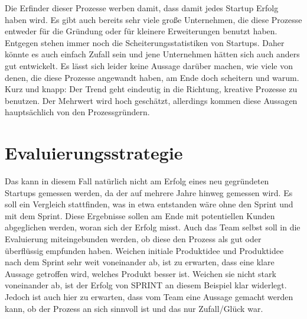 Die Erfinder dieser Prozesse werben damit, dass damit jedes Startup Erfolg haben wird. Es gibt auch bereits sehr viele große Unternehmen, die diese Prozesse entweder für die Gründung oder für kleinere Erweiterungen benutzt haben. Entgegen stehen immer noch die Scheiterungsstatistiken von Startups. Daher könnte es auch einfach Zufall sein und jene Unternehmen hätten sich auch anders gut entwickelt. Es lässt sich leider keine Aussage darüber machen, wie viele von denen, die diese Prozesse angewandt haben, am Ende doch scheitern und warum. Kurz und knapp: Der Trend geht eindeutig in die Richtung, kreative Prozesse zu benutzen. Der Mehrwert wird hoch geschätzt, allerdings kommen diese Aussagen hauptsächlich von den Prozessgründern.


\section{Evaluierungsstrategie}

Das kann in diesem Fall natürlich nicht am Erfolg eines neu gegründeten Startups gemessen werden, da der auf mehrere Jahre hinweg gemessen wird. Es soll ein Vergleich stattfinden, was in etwa entstanden wäre ohne den Sprint und mit dem Sprint. Diese Ergebnisse sollen am Ende mit potentiellen Kunden abgeglichen werden, woran sich der Erfolg misst. Auch das Team selbst soll in die Evaluierung miteingebunden werden, ob diese den Prozess als gut oder überflüssig empfunden haben.
Weichen initiale Produktidee und Produktidee nach dem Sprint sehr weit voneinander ab, ist zu erwarten, dass eine klare Aussage getroffen wird, welches Produkt besser ist. Weichen sie nicht stark voneinander ab, ist der Erfolg von SPRINT an diesem Beispiel klar widerlegt. Jedoch ist auch hier zu erwarten, dass vom Team eine Aussage gemacht werden kann, ob der Prozess an sich sinnvoll ist und das nur Zufall/Glück war.







